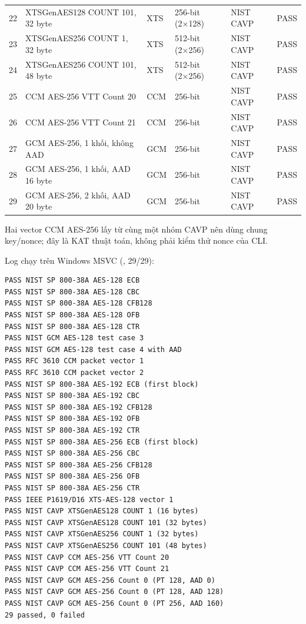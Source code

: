 \documentclass[12pt,a4paper,oneside]{report}
\let\origtexttt\texttt
\renewcommand{\texttt}[1]{\origtexttt{\seqsplit{#1}}}
\begin{document}
\begin{longtable}{p{}p{}p{}p{}p{}p{}}
22 & XTSGenAES128 COUNT 101, 32 byte & XTS & 256-bit (2×128) & NIST CAVP & PASS \\
23 & XTSGenAES256 COUNT 1, 32 byte & XTS & 512-bit (2×256) & NIST CAVP & PASS \\
24 & XTSGenAES256 COUNT 101, 48 byte & XTS & 512-bit (2×256) & NIST CAVP & PASS \\
25 & CCM AES-256 VTT Count 20 & CCM & 256-bit & NIST CAVP & PASS \\
26 & CCM AES-256 VTT Count 21 & CCM & 256-bit & NIST CAVP & PASS \\
27 & GCM AES-256, 1 khối, không AAD & GCM & 256-bit & NIST CAVP & PASS \\
28 & GCM AES-256, 1 khối, AAD 16 byte & GCM & 256-bit & NIST CAVP & PASS \\
29 & GCM AES-256, 2 khối, AAD 20 byte & GCM & 256-bit & NIST CAVP & PASS \\
\bottomrule
\end{longtable}


Hai vector CCM AES-256 lấy từ cùng một nhóm CAVP nên dùng chung key/nonce; đây là KAT thuật toán, không phải kiểm thử nonce của CLI.


Log chạy trên Windows MSVC (\texttt{build/windows-msvc}, 29/29):


\begin{Verbatim}
PASS NIST SP 800-38A AES-128 ECB
PASS NIST SP 800-38A AES-128 CBC
PASS NIST SP 800-38A AES-128 CFB128
PASS NIST SP 800-38A AES-128 OFB
PASS NIST SP 800-38A AES-128 CTR
PASS NIST GCM AES-128 test case 3
PASS NIST GCM AES-128 test case 4 with AAD
PASS RFC 3610 CCM packet vector 1
PASS RFC 3610 CCM packet vector 2
PASS NIST SP 800-38A AES-192 ECB (first block)
PASS NIST SP 800-38A AES-192 CBC
PASS NIST SP 800-38A AES-192 CFB128
PASS NIST SP 800-38A AES-192 OFB
PASS NIST SP 800-38A AES-192 CTR
PASS NIST SP 800-38A AES-256 ECB (first block)
PASS NIST SP 800-38A AES-256 CBC
PASS NIST SP 800-38A AES-256 CFB128
PASS NIST SP 800-38A AES-256 OFB
PASS NIST SP 800-38A AES-256 CTR
PASS IEEE P1619/D16 XTS-AES-128 vector 1
PASS NIST CAVP XTSGenAES128 COUNT 1 (16 bytes)
PASS NIST CAVP XTSGenAES128 COUNT 101 (32 bytes)
PASS NIST CAVP XTSGenAES256 COUNT 1 (32 bytes)
PASS NIST CAVP XTSGenAES256 COUNT 101 (48 bytes)
PASS NIST CAVP CCM AES-256 VTT Count 20
PASS NIST CAVP CCM AES-256 VTT Count 21
PASS NIST CAVP GCM AES-256 Count 0 (PT 128, AAD 0)
PASS NIST CAVP GCM AES-256 Count 0 (PT 128, AAD 128)
PASS NIST CAVP GCM AES-256 Count 0 (PT 256, AAD 160)
29 passed, 0 failed
\end{Verbatim}
\end{document}
